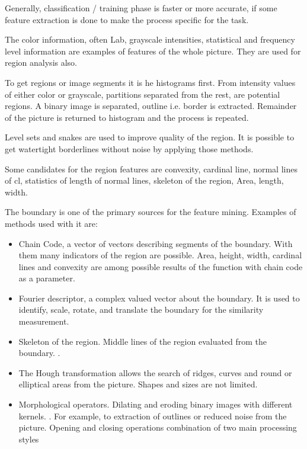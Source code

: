 \documentclass[doc/report.tex]{subfiles}
\begin{document}
Generally, classification / training phase is faster or more accurate, if some
feature extraction is done to make the process specific for the task.

The color information, often Lab, grayscale intensities, statistical and
frequency level information are examples of features of the whole picture. They
are used for region analysis also.

To get regions or image segments it is he histograms first. From intensity
values of either color or grayscale, partitions separated from the rest, are
potential regions. A binary image is separated, outline i.e. border is
extracted. Remainder of the picture is returned to histogram and the process is
repeated.

Level sets and snakes are used to improve quality of the region. It is possible
to get watertight borderlines without noise by applying those methods.

Some candidates for the region features are convexity, cardinal line, normal
lines of cl, statistics of length of normal lines, skeleton of the region,
Area, length, width.

The boundary is one of the primary sources for the feature mining. Examples of
methods used with it are:

\begin{itemize}
    \item Chain Code, a vector of vectors describing segments of the boundary.
        With them many indicators of the region are possible. Area, height,
        width, cardinal lines and convexity are among possible results of the
        function with chain code as a parameter.
    \item Fourier descriptor, a complex valued vector about the boundary. It is
        used to identify, scale, rotate, and translate the boundary for the
        similarity measurement.
    \item Skeleton of the region. Middle lines of the region evaluated from the
        boundary. .
    \item The Hough transformation allows the search of ridges, curves and
        round or elliptical areas from the picture. Shapes and sizes are not
        limited.
    \item Morphological operators. Dilating and eroding binary images with
        different kernels. . For example, to extraction of outlines or reduced
        noise from the picture. Opening and closing operations combination of
        two main processing styles
\end{itemize}
\end{document}
